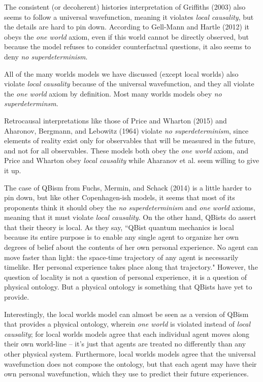 \documentclass[a4paper]{article}
\begin{document}
The consistent (or decoherent) histories interpretation of Griffiths (2003) also seems to follow a universal wavefunction, meaning it violates \textit{local causality}, but the details are hard to pin down.  According to Gell-Mann and Hartle (2012) it obeys the \textit{one world} axiom, even if this world cannot be directly observed, but because the model refuses to consider counterfactual questions, it also seems to deny \textit{no superdeterminism}.

All of the many worlds models we have discussed (except local worlds) also violate \textit{local causality} because of the universal wavefunction, and they all violate the \textit{one world} axiom by definition.  Most many worlds models obey \textit{no superdeterminsm}. 
 
Retrocausal interpretations like those of Price and Wharton (2015) and Aharonov,  Bergmann, and Lebowitz (1964) violate \textit{no superdeterminism}, since elements of reality exist only for observables that will be measured in the future, and not for all observables.  These models both obey the \textit{one world} axiom, and Price and Wharton obey \textit{local causality} while Aharanov et al. seem willing to give it up.
 
 The case of QBism from Fuchs, Mermin, and Schack (2014) is a little harder to pin down, but like other Copenhagen-ish models, it seems that most of its proponents think it should obey the \textit{no superdeterminism} and \textit{one world} axioms, meaning that it must violate \textit{local causality}. On the other hand, QBists do assert that their theory is local. As they say, ``QBist quantum mechanics is local because its entire purpose is to enable any single agent to organize her own degrees of belief about the contents of her own personal experience. No agent can move faster than light: the space-time trajectory of any agent is necessarily timelike. Her personal experience takes place along that trajectory." However,  the question of locality is not a question of personal experience, it is a question of physical ontology. But a physical ontology is something that QBists have yet to provide.  
 
Interestingly, the local worlds model can almost be seen as a version of QBism that provides a physical ontology, wherein \textit{one world} is violated instead of \textit{local causality}; for local worlds models agree that each individual agent moves along their own world-line -- it's just that agents are treated no differently than any other physical system. Furthermore, local worlds models agree that the universal wavefunction does not compose the ontology, but that each agent may have their own personal wavefunction, which they use to predict their future experiences. 
\end{document}

